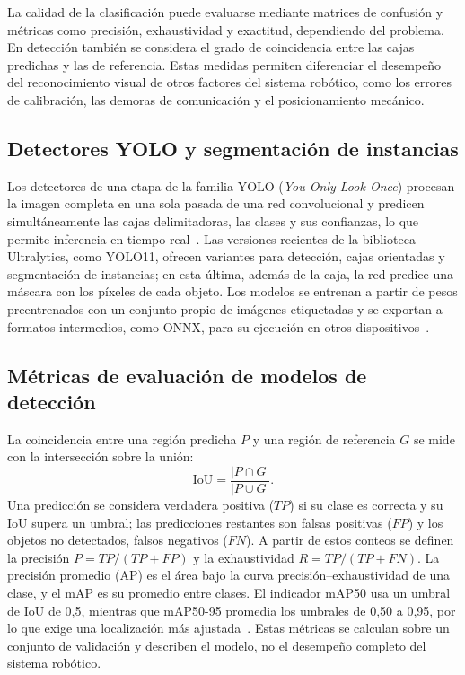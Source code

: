 La calidad de la clasificación puede evaluarse mediante matrices de confusión y métricas como precisión, exhaustividad y exactitud, dependiendo del problema. En detección también se considera el grado de coincidencia entre las cajas predichas y las de referencia. Estas medidas permiten diferenciar el desempeño del reconocimiento visual de otros factores del sistema robótico, como los errores de calibración, las demoras de comunicación y el posicionamiento mecánico.

\subsection{Detectores YOLO y segmentación de instancias}
Los detectores de una etapa de la familia YOLO (\textit{You Only Look Once}) procesan la imagen completa en una sola pasada de una red convolucional y predicen simultáneamente las cajas delimitadoras, las clases y sus confianzas, lo que permite inferencia en tiempo real~\cite{redmon2016yolo}. Las versiones recientes de la biblioteca Ultralytics, como YOLO11, ofrecen variantes para detección, cajas orientadas y segmentación de instancias; en esta última, además de la caja, la red predice una máscara con los píxeles de cada objeto. Los modelos se entrenan a partir de pesos preentrenados con un conjunto propio de imágenes etiquetadas y se exportan a formatos intermedios, como ONNX, para su ejecución en otros dispositivos~\cite{jocher2024yolo11}.

\subsection{Métricas de evaluación de modelos de detección}
La coincidencia entre una región predicha $P$ y una región de referencia $G$ se mide con la intersección sobre la unión:
\begin{equation}
	\mathrm{IoU} = \frac{\lvert P \cap G \rvert}{\lvert P \cup G \rvert}.
\end{equation}
Una predicción se considera verdadera positiva ($TP$) si su clase es correcta y su IoU supera un umbral; las predicciones restantes son falsas positivas ($FP$) y los objetos no detectados, falsos negativos ($FN$). A partir de estos conteos se definen la precisión $P = TP/(TP+FP)$ y la exhaustividad $R = TP/(TP+FN)$. La precisión promedio (AP) es el área bajo la curva precisión--exhaustividad de una clase, y el mAP es su promedio entre clases. El indicador mAP50 usa un umbral de IoU de 0,5, mientras que mAP50-95 promedia los umbrales de 0,50 a 0,95, por lo que exige una localización más ajustada~\cite{szeliski2022computer,jocher2024yolo11}. Estas métricas se calculan sobre un conjunto de validación y describen el modelo, no el desempeño completo del sistema robótico.

